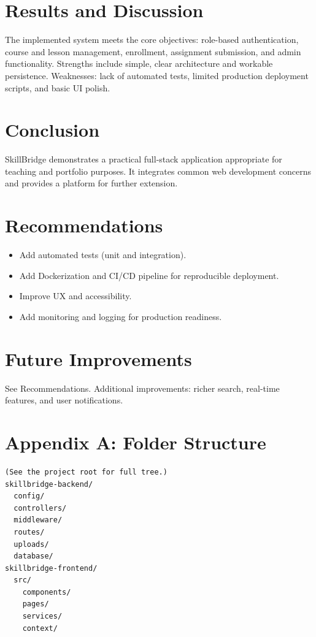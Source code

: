 \documentclass[12pt,a4paper]{report}
\begin{document}
\clearpage

\chapter{Results and Discussion}
The implemented system meets the core objectives: role-based authentication, course and lesson management, enrollment, assignment submission, and admin functionality. Strengths include simple, clear architecture and workable persistence. Weaknesses: lack of automated tests, limited production deployment scripts, and basic UI polish.

\clearpage

\chapter{Conclusion}
SkillBridge demonstrates a practical full-stack application appropriate for teaching and portfolio purposes. It integrates common web development concerns and provides a platform for further extension.

\chapter{Recommendations}
\begin{itemize}
  \item Add automated tests (unit and integration).
  \item Add Dockerization and CI/CD pipeline for reproducible deployment.
  \item Improve UX and accessibility.
  \item Add monitoring and logging for production readiness.
\end{itemize}

\chapter{Future Improvements}
See Recommendations. Additional improvements: richer search, real-time features, and user notifications.

\clearpage




\clearpage

\appendix
\chapter{Appendix A: Folder Structure}
\begin{verbatim}
(See the project root for full tree.)
skillbridge-backend/
  config/
  controllers/
  middleware/
  routes/
  uploads/
  database/
skillbridge-frontend/
  src/
    components/
    pages/
    services/
    context/
\end{verbatim}
\end{document}
